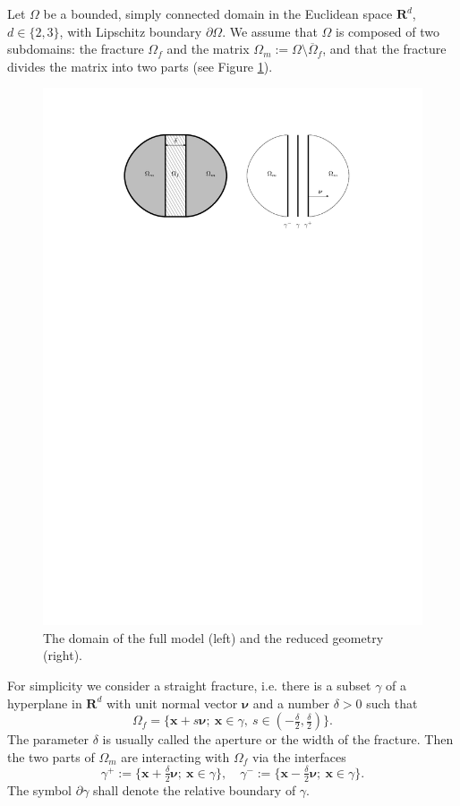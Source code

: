 \documentclass[a4paper]{m2an}
\numberwithin{equation}{section}
\def\nnu{\vc\nu}
\def\prtl{\partial}
\def\Real{{\mathbf R}} %
\def\vc#1{\mathbf{#1}}     %
\def\xx{\vc x}
\newcommand{\eqs}[1]{\begin{equation*}#1\end{equation*}}
\begin{document}
Let $\Omega$ be a bounded, simply connected domain in the Euclidean space $\Real^d$, $d\in\{2,3\}$, with Lipschitz boundary $\partial\Omega$.
We assume that $\Omega$ is composed of two subdomains: the fracture $\Omega_f$ and the matrix $\Omega_m:=\Omega\setminus\overline\Omega_f$, and that the fracture divides the matrix into two parts (see Figure \ref{fig:omegas}).
\begin{figure}[h]
\centering
\includegraphics[width=\textwidth]{figures/omegas}
\caption{The domain of the full model (left) and the reduced geometry (right).}
\label{fig:omegas}
\end{figure}
For simplicity we consider a straight fracture, i.e. there is a subset $\gamma$ of a hyperplane in $\Real^d$ with unit normal vector $\nnu$ and a number $\delta>0$ such that
\eqs{ \Omega_f = \{\xx+s\nnu;~\xx\in\gamma,~s\in(-\tfrac\delta2,\tfrac\delta2)\}. }
The parameter $\delta$ is usually called the aperture or the width of the fracture.
Then the two parts of $\Omega_m$ are interacting with $\Omega_f$ via the interfaces
\eqs{ \gamma^+ := \{\xx+\tfrac\delta2\nnu;~\xx\in\gamma\},\quad \gamma^- := \{\xx-\tfrac\delta2\nnu;~\xx\in\gamma\}. }
The symbol $\prtl\gamma$ shall denote the relative boundary of $\gamma$.
\end{document}
